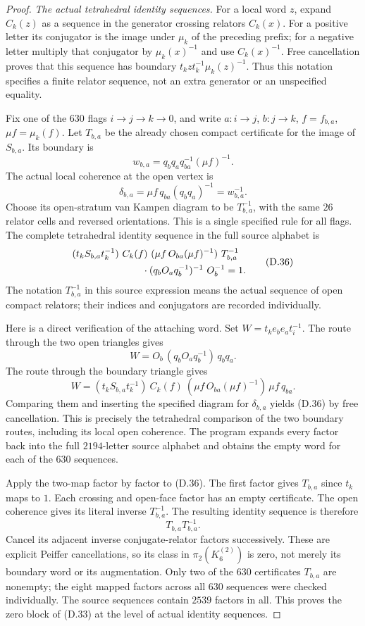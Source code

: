 \begin{proof}
\emph{The actual tetrahedral identity sequences.}
For a local word $z$, expand $C_k(z)$ as a sequence
in the generator crossing relators $C_k(x)$.
For a positive letter its conjugator is the image
under $\mu_k$ of the preceding prefix; for a negative
letter multiply that conjugator by $\mu_k(x)^{-1}$
and use $C_k(x)^{-1}$.  Free cancellation proves that
this sequence has boundary
$t_kzt_k^{-1}\mu_k(z)^{-1}$.
Thus this notation specifies a finite relator sequence,
not an extra generator or an unspecified equality.

Fix one of the $630$ flags $i\to j\to k\to0$, and
write $a:i\to j$, $b:j\to k$, $f=f_{b,a}$,
$\mu f=\mu_k(f)$.  Let $T_{b,a}$ be the already
chosen compact certificate for the image of
$S_{b,a}$.  Its boundary is
\[
             w_{b,a}=q_bq_aq_{ba}^{-1}(\mu f)^{-1}.
\]
The actual local coherence at the open vertex is
\[
             \delta_{b,a}=\mu f\,q_{ba}(q_bq_a)^{-1}
                          =w_{b,a}^{-1}.
\]
Choose its open-stratum van Kampen diagram to be
$T_{b,a}^{-1}$, with the same $26$ relator cells and
reversed orientations.  This is a single specified
rule for all flags.  The complete tetrahedral
identity sequence in the full source alphabet is
\[
\begin{split}
 &(t_k S_{b,a}t_k^{-1})\ C_k(f)\
       (\mu f\,O_{ba}(\mu f)^{-1})\ T_{b,a}^{-1}\\
 &\hspace{25mm}\cdot
       (q_bO_aq_b^{-1})^{-1}\ O_b^{-1}=1.
\end{split}\tag{D.36}
\]
The notation $T_{b,a}^{-1}$ in this source expression
means the actual sequence of open compact relators;
their indices and conjugators are recorded individually.

Here is a direct verification of the attaching word.
Set $W=t_ke_be_at_i^{-1}$.
The route through the two open triangles gives
\[
 W=O_b\,(q_bO_aq_b^{-1})\,q_bq_a.
\]
The route through the boundary triangle gives
\[
 W=(t_kS_{b,a}t_k^{-1})\ C_k(f)\
             (\mu f\,O_{ba}(\mu f)^{-1})\,\mu f\,q_{ba}.
\]
Comparing them and inserting the specified diagram
for $\delta_{b,a}$ yields (D.36) by free cancellation.
This is precisely the tetrahedral comparison of the
two boundary routes, including its local open coherence.
The program expands every factor back into the full
$2194$-letter source alphabet and obtains the empty
word for each of the $630$ sequences.

Apply the two-map factor by factor to (D.36).
The first factor gives $T_{b,a}$ since $t_k$ maps to
$1$.  Each crossing and open-face factor has an
empty certificate.  The open coherence gives its
literal inverse $T_{b,a}^{-1}$.  The resulting
identity sequence is therefore
\[
                         T_{b,a}T_{b,a}^{-1}.             \tag{D.37}
\]
Cancel its adjacent inverse conjugate-relator factors
successively.  These are explicit Peiffer cancellations,
so its class in $\pi_2(K_6^{(2)})$ is zero, not merely
its boundary word or its augmentation.
Only two of the $630$ certificates $T_{b,a}$ are
nonempty; the eight mapped factors across all
$630$ sequences were checked individually.
The source sequences contain $2539$ factors in all.
This proves the zero block of (D.33) at the level of
actual identity sequences.


\end{proof}
